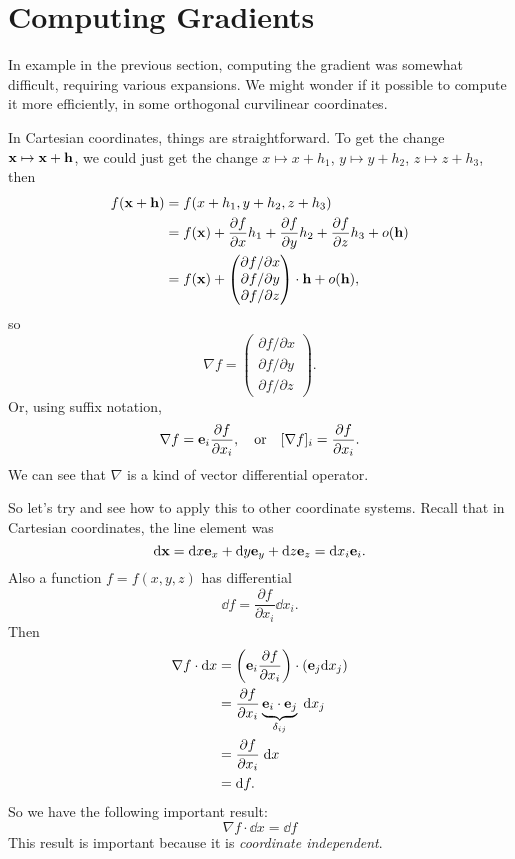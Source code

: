 \documentclass[a4paper]{scrreprt}
\begin{document}
 \section{Computing Gradients}

In example in the previous section, computing the gradient was somewhat difficult, requiring various expansions. We might wonder if it possible to compute it more efficiently, in some orthogonal curvilinear coordinates.

In Cartesian coordinates, things are straightforward.
To get the change $\mathbf{x} \mapsto \mathbf{x} + \mathbf{h}$, we could just get the change $x \mapsto x + h_1$, $y \mapsto y + h_2$, $z \mapsto z + h_3$, then
\begin{align*}
f(\mathbf{x} + \mathbf{h}) &= f(x + h_1, y + h_2, z + h_3) \\
				   &= f(\mathbf{x}) + \frac{\partial f}{\partial x} h_1 + \frac{\partial f}{\partial y} h_2  + \frac{\partial f}{\partial z} h_3 + o(\mathbf{h}) \\
				   &= f(\mathbf{x}) +  \begin{pmatrix}
					\partial f / \partial x \\
					\partial f / \partial y \\
					\partial f / \partial z 
				   \end{pmatrix} \cdot \mathbf{h} + o(\mathbf{h}),
\end{align*}
so
$$
\nabla f = \begin{pmatrix}
	\partial f / \partial x \\
	\partial f / \partial y \\
	\partial f / \partial z 
   \end{pmatrix}.
$$
Or, using suffix notation, 
$$
\nabla f = \mathbf{e}_i \frac{\partial f}{\partial x_i}, \quad \text{or} \quad [\nabla f]_i = \frac{\partial f}{\partial x_i}.
$$
We can see that $\nabla$ is a kind of vector differential operator.

So let's try and see how to apply this to other coordinate systems. Recall that in Cartesian coordinates, the line element was
$$
\mathrm{d} \mathbf{x} = \mathrm{d} x \mathbf{e}_x + \mathrm{d} y \mathbf{e}_y + \mathrm{d} z \mathbf{e}_z = \mathrm{d} x_i \mathbf{e}_i.
$$
Also a function $f = f(x, y, z)$ has differential
$$
\dd f = \frac{\partial f}{\partial x_i} \dd x_i.
$$
Then
\begin{align*}
	\nabla f \cdot \mathrm{d}{x} &= \left(\mathbf{e}_i \frac{\partial f}{\partial x_i}\right) \cdot (\mathbf{e}_j \mathrm{d} x_j) \\
	&= \frac{\partial f}{\partial x_i} \underbrace{\mathbf{e}_i \cdot \mathbf{e}_j}_{\delta_{ij}} \; \mathrm{d} x_j \\
	&= \frac{\partial f}{\partial x_i} \; \mathrm{d} x \\
	&= \mathrm{d} f.
\end{align*}
So we have the following important result:
$$
\boxed{\nabla f \cdot \dd x = \dd f}
$$
This result is important because it is \emph{coordinate independent}.
\end{document}
